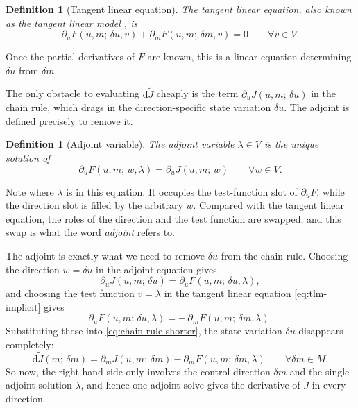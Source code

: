 \documentclass[a4paper,11pt]{article}
\newcommand{\Jt}{\tilde{J}}                  %
\newcommand{\Mspace}{M}
\theoremstyle{spacedplain} \newtheorem{theorem}[counter]{Theorem} \newtheorem{lemma}[counter]{Lemma} \newtheorem{prop}[counter]{Proposition} \newtheorem{cor}[counter]{Corollary}
\theoremstyle{spaceddefinition} \newtheorem{defn}[counter]{Definition} \newtheorem{example}[counter]{Example} \newtheorem{remark}[counter]{Remark}
\begin{document}
\begin{defn}[Tangent linear equation]
\label{defn:tlm}
The \emph{tangent linear equation}, also known as the tangent linear model \citep[p.~32]{shfp2017}, is
\begin{equation}
  \label{eq:tlm-implicit}
  \partial_u F(u, m;\, \delta u, v)
  + \partial_m F(u, m;\, \delta m, v) = 0
  \qquad \forall v \in V.
\end{equation}
\end{defn}

Once the partial derivatives of $F$ are known, this is a linear equation determining $\delta u$ from $\delta m$.

The only obstacle to evaluating $\mathrm{d}\Jt$ cheaply is the term $\partial_u J(u, m;\, \delta u)$ in the chain rule, which drags in the direction-specific state variation $\delta u$. The adjoint is defined precisely to remove it.

\begin{defn}[Adjoint variable]
\label{defn:adjoint}
The \emph{adjoint variable} $\lambda \in V$ is the unique solution of
\begin{equation}
  \label{eq:adjoint-general}
  \partial_u F(u, m;\, w, \lambda)
  = \partial_u J(u, m;\, w)
  \qquad \forall w \in V.
\end{equation}
\end{defn}

Note where $\lambda$ is in this equation. It occupies the test-function slot of $\partial_u F$, while the direction slot is filled by the arbitrary $w$. Compared with the tangent linear equation, the roles of the direction and the test function are swapped, and this swap is what the word \emph{adjoint} refers to.

The adjoint is exactly what we need to remove $\delta u$ from the chain rule. Choosing the direction $w = \delta u$ in the adjoint equation gives
\begin{equation}
  \partial_u J(u, m;\, \delta u) = \partial_u F(u, m;\, \delta u, \lambda),
\end{equation}
and choosing the test function $v = \lambda$ in the tangent linear equation \cref{eq:tlm-implicit} gives
\begin{equation}
  \partial_u F(u, m;\, \delta u, \lambda) = -\,\partial_m F(u, m;\, \delta m, \lambda).
\end{equation}
Substituting these into \cref{eq:chain-rule-shorter}, the state variation $\delta u$ disappears completely:
\begin{equation}
  \label{eq:dJtilde-general}
  \mathrm{d}\Jt(m;\, \delta m)
  = \partial_m J(u, m;\, \delta m)
  - \partial_m F(u, m;\, \delta m, \lambda)
  \qquad \forall \delta m \in \Mspace.
\end{equation}
So now, the right-hand side only involves the control direction $\delta m$ and the single adjoint solution $\lambda$, and hence one adjoint solve gives the derivative of $\Jt$ in every direction.
\end{document}
